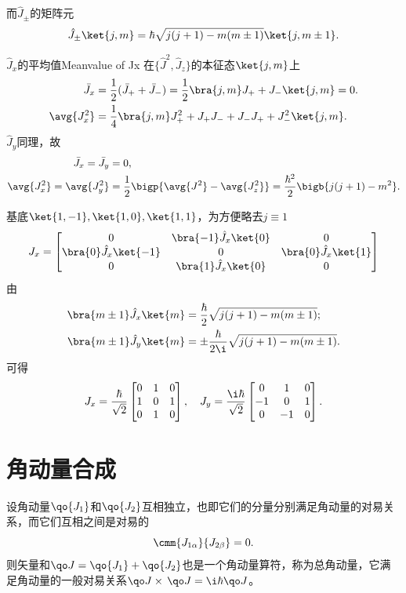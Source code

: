 而$\hat J_\pm$的矩阵元
\begin{align}
	\hat J_\pm\ket{j,m}=\hbar\sqrt{j(j+1)-m(m\pm 1)}\ket{j,m\pm 1}.
\end{align}
\begin{example}{$\hat J_x$的平均值}{Meanvalue of Jx}
	在$\{\hat J^2,\hat J_z\}$的本征态$\ket{j,m}$上
	\begin{align*}
		\bar J_x&=\frac12(\bar J_++\bar J_-)=\frac12\bra{j,m}J_++J_-\ket{j,m}=0.\\
		\avg{J_x^2}&=\frac14\bra{j,m}J_+^2+J_+J_-+J_-J_++J_-^2\ket{j,m}.
	\end{align*}
	$\hat J_y$同理，故
	\begin{align*}
		\bar J_x=\bar J_y&=0,\\
		\avg{J_x^2}=\avg{J_y^2}&=\frac12\bigp{\avg{J^2}-\avg{J_z^2}}=\frac{\hbar^2}2\bigb{j(j+1)-m^2}.
	\end{align*}
\end{example}
\begin{example}{}{}
	基底$\ket{1,-1},\ket{1,0},\ket{1,1}$，为方便略去$j\equiv 1$ %
	\begin{align*}
		J_x=\begin{bmatrix}
			0&\bra{-1}\hat J_x\ket{0}&0\\
			\bra{0}\hat J_x\ket{-1}&0&\bra{0}\hat J_x\ket{1}\\
			0&\bra{1}\hat J_x\ket{0}&0
		\end{bmatrix}
	\end{align*}
	由
	\begin{align*}
		\bra{m\pm 1}\hat J_x\ket{m}&=\frac\hbar{2}\sqrt{j(j+1)-m(m\pm 1)};\\
		\bra{m\pm 1}\hat J_y\ket{m}&=\pm\frac\hbar{2\i}\sqrt{j(j+1)-m(m\pm 1)}.
	\end{align*}
	可得 
	\begin{align*}
		J_x=\frac\hbar{\sqrt2}\begin{bmatrix}
			0&1&0\\1&0&1\\0&1&0
		\end{bmatrix},\quad J_y=\frac{\i\hbar}{\sqrt2}\begin{bmatrix}
			0&1&0\\-1&0&1\\0&-1&0
		\end{bmatrix}.
	\end{align*}
\end{example}
\section{角动量合成}
设角动量$\qo{J_1}$和$\qo{J_2}$互相独立，也即它们的分量分别满足角动量的对易关系，而它们互相之间是对易的
\[
	\cmm{J_{1\alpha}}{J_{2\beta}}=0.
\]
则矢量和$\qo J=\qo{J_1}+\qo{J_2}$也是一个角动量算符，称为总角动量，它满足角动量的一般对易关系$\qo J\times\,\qo J=\i\hbar\qo J$。

